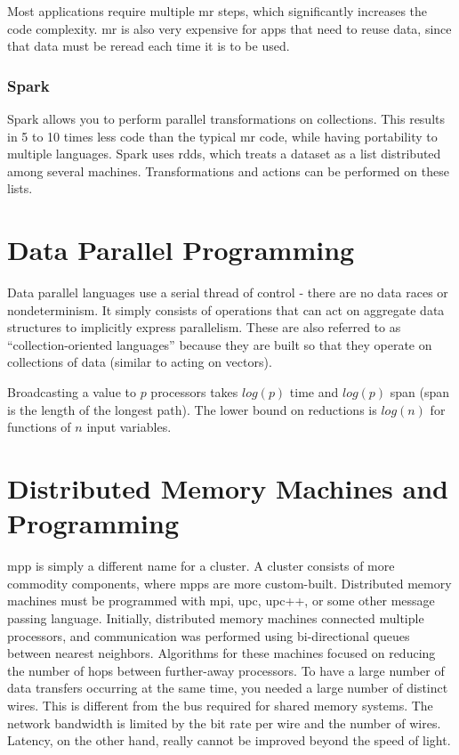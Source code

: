\documentclass[10pt]{article}
\begin{document}
\begin{flushleft}
Most applications require multiple \gls{mr} steps, which significantly increases the code complexity. \gls{mr} is also very expensive for apps that need to reuse data, since that data must be reread each time it is to be used.

\subsubsection{Spark}

Spark allows you to perform parallel transformations on collections. This results in 5 to 10 times less code than the typical \gls{mr} code, while having portability to multiple languages. Spark uses \gls{rdd}s, which treats a dataset as a list distributed among several machines. Transformations and actions can be performed on these lists. 

\section{Data Parallel Programming}

Data parallel languages use a serial thread of control - there are no data races or nondeterminism. It simply consists of operations that can act on aggregate data structures to implicitly express parallelism. 
These are also referred to as ``collection-oriented languages'' because they are built so that they operate on collections of data (similar to acting on vectors). 

Broadcasting a value to \(p\) processors takes \(log(p)\) time and \(log(p)\) span (span is the length of the longest path). The lower bound on reductions is \(log(n)\) for functions of \(n\) input variables. 

\section{Distributed Memory Machines and Programming}

\gls{mpp} is simply a different name for a cluster. A cluster consists of more commodity components, where \gls{mpp}s are more custom-built. Distributed memory machines must be programmed with \gls{mpi}, \gls{upc}, \gls{upc}++, or some other message passing language. Initially, distributed memory machines connected multiple processors, and communication was performed using bi-directional queues between nearest neighbors. Algorithms for these machines focused on reducing the number of hops between further-away processors. To have a large number of data transfers occurring at the same time, you needed a large number of distinct wires. This is different from the bus required for shared memory systems. The network bandwidth is limited by the bit rate per wire and the number of wires. Latency, on the other hand, really cannot be improved beyond the speed of light.


\end{flushleft}
\end{document}
